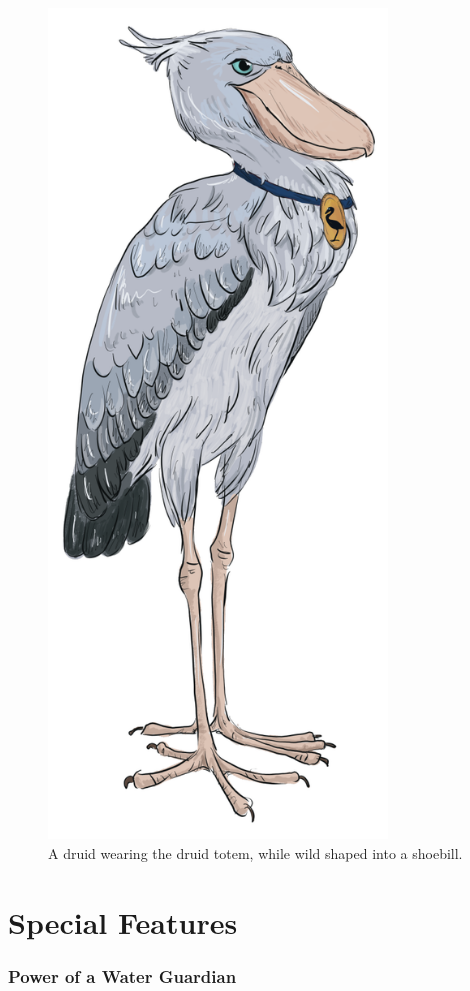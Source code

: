 \documentclass[letter,10pt,twocolumn,openany]{dndbook}
\begin{document}
\begin{figure}
    \includegraphics[width=9cm]{images/shoebill.png}
    \caption{A druid wearing the druid totem, while wild shaped into a shoebill.}
\end{figure}

\chapter{Special Features}

\subsection{Power of a Water Guardian}
\end{document}
